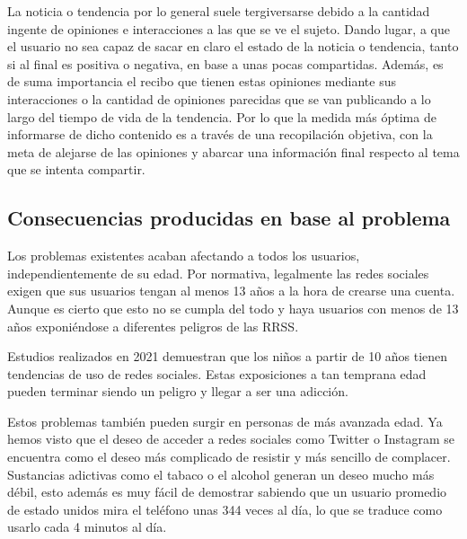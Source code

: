\vspace{0.3cm}

La noticia o tendencia por lo general suele tergiversarse debido a la cantidad ingente de opiniones e interacciones a las que se ve el sujeto. Dando lugar, a que el usuario no sea capaz de sacar en claro el estado de la noticia o tendencia, tanto si al final es positiva o negativa, en base a unas pocas compartidas. Además, es de suma importancia el recibo que tienen estas opiniones mediante sus interacciones o la cantidad de opiniones parecidas que se van publicando a lo largo del tiempo de vida de la tendencia. Por lo que la medida más óptima de informarse de dicho contenido es a través de una recopilación objetiva, con la meta de alejarse de las opiniones y abarcar una información final respecto al tema que se intenta compartir.

\subsection{Consecuencias producidas en base al problema}\label{sec:consec_problm}

Los problemas existentes acaban afectando a todos los usuarios, independientemente de su edad. Por normativa, legalmente las redes sociales exigen que sus usuarios tengan al menos 13 años a la hora de crearse una cuenta. Aunque es cierto que esto no se cumpla del todo y haya usuarios con menos de 13 años exponiéndose a diferentes peligros de las \acs{RRSS}.

\vspace{0.3cm}

Estudios realizados en 2021 demuestran que los niños a partir de 10 años tienen tendencias de uso de redes sociales. Estas exposiciones a tan temprana edad pueden terminar siendo un peligro y llegar a ser una adicción.  \cite{Adiccion-RRSS}

\vspace{0.3cm}

Estos problemas también pueden surgir en personas de más avanzada edad. Ya hemos visto que el deseo de acceder a redes sociales como Twitter o Instagram se encuentra como el deseo más complicado de resistir y más sencillo de complacer. Sustancias adictivas como el tabaco o el alcohol generan un deseo mucho más débil, esto además es muy fácil de demostrar sabiendo que un usuario promedio de estado unidos mira el teléfono unas 344 veces al día, lo que se traduce como usarlo cada 4 minutos al día. \cite{Reviews-RRSS-AS}

